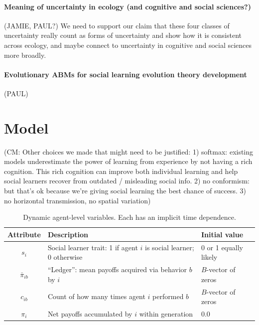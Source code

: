 \documentclass[letterpaper,11.5pt]{scrartcl}
\newcommand{\cm}[1]{{\textcolor{mypurple} {({\tiny CM:} #1)}}}
\begin{document}
\paragraph{Meaning of uncertainty in ecology (and cognitive and social sciences?) } (JAMIE, PAUL?)
We need to support our claim that these four classes of uncertainty really 
count as forms of uncertainty and show how it is consistent across ecology,
and maybe connect to uncertainty in cognitive and social sciences more broadly.

\paragraph{Evolutionary ABMs for social learning evolution theory development} (PAUL)


\section{Model}

\cm{Other choices we made that might need to be justified: 1) softmax: existing models underestimate the power of learning from experience by not having a rich cognition. This rich cognition can improve both individual learning and help social learners recover from outdated / misleading social info. 2) no conformism: but that's ok because we're giving social learning the best chance of success. 3) no horizontal transmission, no spatial variation}

\begin{table}[h]
    \caption{Dynamic agent-level variables. Each has an implicit time dependence.}
    \label{tab:modelParameters}
    \centering %
    \begin{tabular}{cp{4.0in}p{1.25in}} \toprule

        Attribute & Description & Initial value \\ 

        \midrule  

        $s_i$  & Social learner trait: 1 if agent $i$ is social learner; 0 otherwise & 0
        or 1 equally likely \\

        $\bar\pi_{ib}$ & ``Ledger'': mean payoffs acquired via behavior $b$ by $i$ 
                       & $B$-vector of zeros \\

        $c_{ib}$ & Count of how many times agent $i$ performed $b$ 
              & $B$-vector of zeros \\

        $\pi_i$ & Net payoffs accumulated by $i$ within generation
                                & 0.0 \\
        \bottomrule
    \end{tabular}
\end{table}
\end{document}
